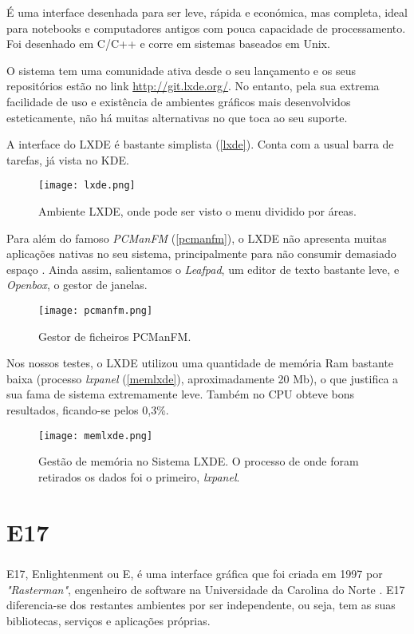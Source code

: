 \documentclass[11pt,openright,twoside]{report}
\begin{document}
É uma interface desenhada para ser leve, rápida e económica, mas completa, ideal para notebooks e computadores antigos com pouca capacidade de processamento. Foi desenhado em C/C++ e corre em sistemas baseados em Unix.

O sistema tem uma comunidade ativa desde o seu lançamento e os seus repositórios estão no link \url{http://git.lxde.org/}. No entanto, pela sua extrema facilidade de uso e existência de ambientes gráficos mais desenvolvidos esteticamente, não há muitas alternativas no que toca ao seu suporte.

A interface do LXDE é bastante simplista (\autoref{lxde}). Conta com a usual barra de tarefas, já vista no KDE.

\begin{figure}
 \center
 \texttt{[image: lxde.png]}
 \caption{Ambiente LXDE, onde pode ser visto o menu dividido por áreas.}
 \label{lxde}
\end{figure}

Para além do famoso \textit{PCManFM} (\autoref{pcmanfm}), o LXDE não apresenta muitas aplicações nativas no seu sistema, principalmente para não consumir demasiado espaço \cite{AplicacoesLXDE}. Ainda assim, salientamos o \textit{Leafpad}, um editor de texto bastante leve, e \textit{Openbox}, o gestor de janelas.

\begin{figure}
 \center
 \texttt{[image: pcmanfm.png]}
 \caption{Gestor de ficheiros PCManFM.}
 \label{pcmanfm}
\end{figure}

Nos nossos testes, o LXDE utilizou uma quantidade de memória Ram bastante baixa (processo \textit{lxpanel} (\autoref{memlxde}), aproximadamente 20 Mb), o que justifica a sua fama de sistema extremamente leve. Também no CPU obteve bons resultados, ficando-se pelos 0,3\%.

\begin{figure}
 \center
 \texttt{[image: memlxde.png]}
 \caption{Gestão de memória no Sistema LXDE. O processo de onde foram retirados os dados foi o primeiro, \textit{lxpanel}.}
 \label{memlxde}
\end{figure}


\chapter{E17}

\paragraph{  }E17, Enlightenment ou E, é uma interface gráfica que foi criada em 1997 por \textit{"Rasterman"}, engenheiro de software na Universidade da Carolina do Norte \cite{E17}. E17 diferencia-se dos restantes ambientes por ser independente, ou seja, tem as suas bibliotecas, serviços e aplicações próprias.
\end{document}
